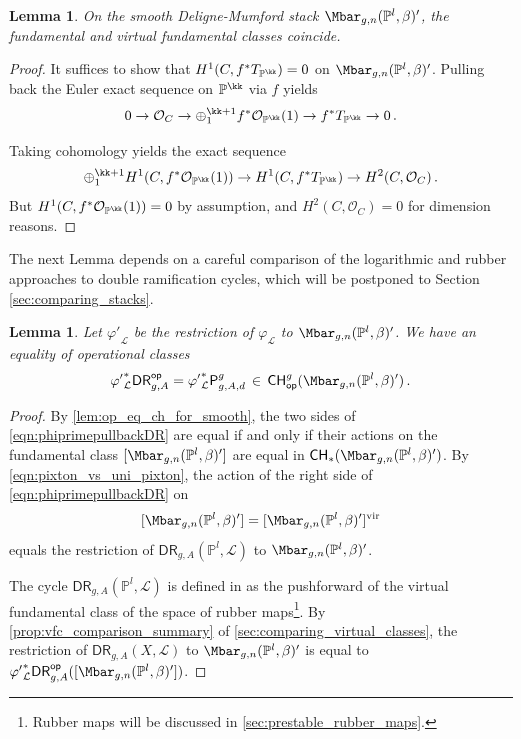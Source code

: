 \documentclass[a4paper,12pt]{article} %
\newcommand{\bb}[1]{{\mathbb{#1}}}
\newcommand{\ca}[1]{{\mathcal{#1}}}
\def\P{\mathsf{P}}
\def\DR{\mathsf{DR}}
\theoremstyle{definition}
\theoremstyle{plain}%
\newtheorem{lemma}[definition]{Lemma}
\renewcommand{\phi}{\varphi}
\newcommand{\Chow}{\mathsf{CH}}
\newcommand{\CHop}{\Chow_{\mathsf{op}}}
\newcommand{\DRop}{\mathsf{DR}^{\mathsf{op}}}
\begin{document}
\begin{lemma}\label{lem:fun_eq_vfc}
On the smooth Deligne-Mumford stack $\Mbar_{g,n}(\mathbb{P}^l,\beta)'$, the fundamental and virtual fundamental classes coincide. 
\end{lemma}
\begin{proof}
It suffices to show that $H^1(C, f^*T_{\bb P^\kk}) = 0$ on $\Mbar_{g,n}(\mathbb{P}^l,\beta)'$. Pulling back the Euler exact sequence on $\bb P^\kk$ via $f$ yields 
\begin{equation}
0 \to \ca O_C \to \oplus_{1}^{\kk+1} f^*\ca O_{\bb P^\kk}(1) \to f^*T_{\bb P^\kk} \to 0\, .
\end{equation}

 Taking cohomology yields the exact sequence
\begin{equation}
\oplus_{1}^{\kk+1} H^1(C, f^*\ca O_{\bb P^\kk}(1)) \to H^1(C, f^*T_{\bb P^\kk}) \to H^2(C, \ca O_C)\, .
\end{equation}
But $H^1(C, f^*\ca O_{\bb P^\kk}(1)) = 0$ by assumption, and $H^2(C, \ca O_C) = 0$ for dimension reasons. %
\end{proof}

The next Lemma depends on a careful comparison of the logarithmic and rubber approaches to double ramification cycles, which will be postponed to Section \ref{sec:comparing_stacks}. 
\begin{lemma}\label{cor:operational_equality_projective}\label{lem:projective_space_comparison}
Let ${\phi'}_{\ca L}$ be the restriction of ${\phi}_{\ca L}$ to $\Mbar_{g,n}(\mathbb{P}^l,\beta)'$. We have an equality of operational classes 
\begin{equation} \label{eqn:phiprimepullbackDR}
{\phi'}_{\ca L}^*\DRop_{g,A}=
{\phi'}_{\ca L}^*{\P_{g,A,d}^g}  \, \in \, \CHop^g(\Mbar_{g,n}(\mathbb{P}^l,\beta)')\, .
\end{equation}
\end{lemma}
\begin{proof}

By \cref{lem:op_eq_ch_for_smooth}, the two sides of  \eqref{eqn:phiprimepullbackDR} are equal if and only if their actions on the fundamental class $[\Mbar_{g,n}(\mathbb{P}^l,\beta)']$ are equal in $\Chow_*(\Mbar_{g,n}(\mathbb{P}^l,\beta)')$. 
By  \eqref{eqn:pixton_vs_uni_pixton}, the action of the right side of \eqref{eqn:phiprimepullbackDR} on 
$$[\Mbar_{g,n}(\mathbb{P}^l,\beta)']=[\Mbar_{g,n}(\mathbb{P}^l,\beta)']^\textup{vir}$$ 
equals the restriction of $\DR_{g,A}(\mathbb{P}^l,\ca L)$ to 
$\Mbar_{g,n}(\mathbb{P}^l,\beta)'$.

The cycle $\DR_{g,A}(\mathbb{P}^l,\ca L)$
is defined in \cite{Janda2018Double-ramifica} as the pushforward of the virtual fundamental class of the space of rubber maps{\footnote{Rubber maps will
be discussed in \cref{sec:prestable_rubber_maps}.}}.  
By \cref{prop:vfc_comparison_summary} of 
\cref{sec:comparing_virtual_classes}, the restriction of
$\DR_{g,A}(X,\ca L)$ to $\Mbar_{g,n}(\mathbb{P}^l,\beta)'$ is equal to ${\phi'}_{\ca L}^*\DRop_{g,A}( [\Mbar_{g,n}(\mathbb{P}^l,\beta)'])$. 

\end{proof}
\end{document}
